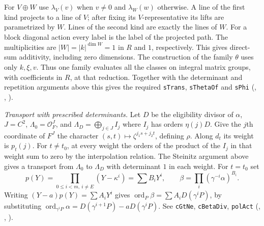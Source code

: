 For $V\oplus W$ use $\lambda_V(v)$ when $v\ne0$ and $\lambda_W(w)$
otherwise. A line of the first kind projects to a line of $V$; after
fixing its $V$-representative its lifts are parametrized by $W$.
Lines of the second kind are exactly the lines of $W$. For a block
diagonal action every label is the label of the projected path.
The multiplicities are $|W|=|k|^{\dim W}=1$ in $R$ and $1$,
respectively. This gives direct-sum additivity, including zero
dimensions. The construction of the family $\theta$ uses only
$k,\xi,v$. Thus one family evaluates all the classes on integral matrix groups, with coefficients in $R$, at that reduction. Together with the determinant and repetition
arguments above this gives the required \nolinkurl{sTrans},
\nolinkurl{sThetaOf} and \nolinkurl{sPhi}
(,
,
).

\emph{Transport with prescribed determinants.} Let $D$ be the
eligibility divisor of $\alpha$, $J=C^2$, $\Lambda_0=\mathcal O_F^J$,
and $\Lambda_D=\bigoplus_{j\in J}I_j$ where $I_j$ has orders
$\eta(j)D$. Give the $j$th coordinate of $F^J$ the character
$(s,t)\mapsto\zeta^{j_1s+j_2t}$, defining $\rho$.
Along $d_t$ its weight is $p_t(j)$. For $t\ne t_0$, at every
weight the orders of the product of the $I_j$ in that weight sum to
zero by the interpolation relation. The Steinitz argument above gives
a transport from $\Lambda_0$ to $\Lambda_D$ with determinant $1$
in each weight. For $t=t_0$ set
\[
 p(Y)=\prod_{0\le i<m,\ i\ne E}(Y-\kappa^i)=\sum B_iY^i,
 \qquad \beta=\prod_i(\gamma^{-i}\alpha)^{B_i}.
\]
Writing $(Y-a)p(Y)=\sum A_iY^i$ gives
$\operatorname{ord}_P\beta=\sum A_iD(\gamma^iP)$, by substituting
$\operatorname{ord}_{\gamma^iP}\alpha=
D(\gamma^{i+1}P)-aD(\gamma^iP)$.
See \nolinkurl{cGtNe}, \nolinkurl{cBetaDiv}, \nolinkurl{polAct}
(,
,
).

